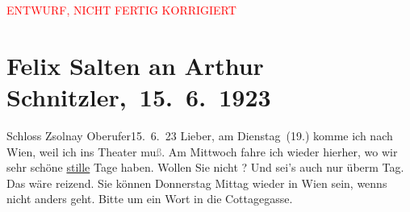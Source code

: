 
\begin{center}
            \textcolor{red}{ENTWURF, NICHT FERTIG KORRIGIERT}
                      \end{center}
            
         
         \renewcommand{\erwaehntePersonen}{Personen: Frieda Pollak, Felix Salten, Amanda von Zsolnay}
         \renewcommand{\erwaehnteOrte}{Orte: Cottagegasse, Prievoz, Schloss Csáky, Wien}
         \renewcommand{\erwaehnteWerke}{}
               \section[ Felix Salten an Arthur Schnitzler, 15. 6. 1923]{ Felix Salten an Arthur Schnitzler, 15. 6. 1923}\nopagebreak{}\rehead{ }\begin{ledgroupsized}[t]{13cm}\normalsize\beginnumbering \toendnotes[C]{\smallbreak\pagebreak[2]} 
\toendnotes[C]{\smallbreak}\pstart
           \noindent{}\centering{}{\pb}{[}Schloss Zsolnay\oindex{Schloss Csáky@\textbf{Schloss Csáky}|pw}{]}\pend
           \pstart
           \raggedleft{}{\pb}Oberufer15. 6. 23\pend
           \pstart{}Lieber,\pend\pstart
           am Dienstag (19.) komme ich nach Wien, weil ich ins Theater mu\textcolor{gray}{ß}. Am Mittwoch fahre ich wieder hierher, wo wir sehr schöne \uline{stille} Tage haben. Wollen Sie nicht \label{K_L02793-1v}\label{K_L02793-1h}?
               Und sei’s auch nur überm Tag. Das wäre reizend. Sie können Donnerstag{ }Mittag wieder in Wien sein, wenns
               nicht anders geht. Bitte um ein Wort in die Cottagegasse.\pend

\end{ledgroupsized}
